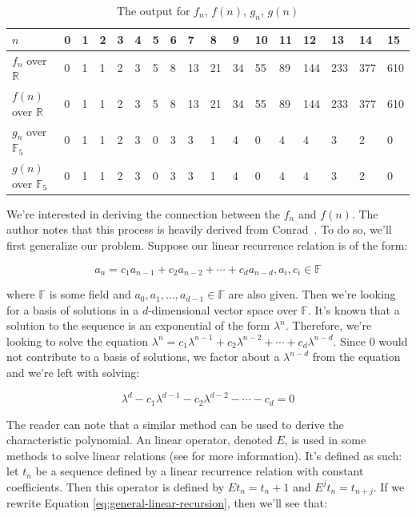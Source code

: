 \documentclass[a4paper]{article}
\theoremstyle{definition}
\begin{document}
\begin{table}[ht]
\centering
\begin{tabular}{lllllllllllllllll}
\toprule
$n$ & 0 & 1 & 2 & 3 & 4 & 5 & 6 & 7 & 8 & 9 & 10 & 11 & 12 & 13 & 14 & 15                             \\
\midrule
$f_n$ over $\mathbb{R}$ & 0 & 1 & 1 & 2 & 3 & 5 & 8 & 13 & 21 & 34 & 55 & 89 & 144 & 233 & 377 & 610  \\
$f(n)$ over $\mathbb{R}$ & 0 & 1 & 1 & 2 & 3 & 5 & 8 & 13 & 21 & 34 & 55 & 89 & 144 & 233 & 377 & 610 \\
$g_n$ over $\mathbb{F}_5$ & 0 & 1 & 1 & 2 & 3 & 0 & 3 & 3 & 1 & 4 & 0 & 4 & 4 & 3 & 2 & 0             \\
$g(n)$ over $\mathbb{F}_5$ & 0 & 1 & 1 & 2 & 3 & 0 & 3 & 3 & 1 & 4 & 0 & 4 & 4 & 3 & 2 & 0            \\
\bottomrule
\end{tabular}
\caption{The output for $f_n$, $f(n)$, $g_n$, $g(n)$}
\label{tab:fib-output}
\end{table}

We're interested in deriving the connection between the $f_n$ and $f(n)$. The author notes that this
process is heavily derived from Conrad~\cite{bib:solve-lin-rec-field}. To do so, we'll first generalize
our problem. Suppose our linear recurrence relation is of the form:

\begin{equation}
a_n=c_1a_{n-1}+c_2a_{n-2}+\cdots+c_{d}a_{n-d}, a_i, c_i \in \mathbb{F}
\label{eq:general-linear-recursion}
\end{equation}

where $\mathbb{F}$ is some field and $a_0, a_1, \ldots, a_{d-1} \in \mathbb{F}$ are also given. Then
we're looking for a basis of solutions in a $d$-dimensional vector space over $\mathbb{F}$. It's known
that a solution to the sequence is an exponential of the form $\lambda^n$\cite{bib:solve-lin-rec-field}.
Therefore, we're looking to solve the equation
$\lambda^n=c_1\lambda^{n-1}+c_2\lambda^{n-2}+\cdots+c_d\lambda^{n-d}$. Since $0$ would not contribute to
a basis of solutions, we factor about a $\lambda^{n-d}$ from the equation and we're left with solving:

\begin{equation}
\lambda^d-c_1\lambda^{d-1}-c_2\lambda^{d-2}-\cdots-c_d=0
\label{eq:char-poly}
\end{equation}

The reader can note that a similar method can be used to derive the characteristic polynomial. An linear
operator, denoted $E$, is used in some methods to solve linear relations (see
\cite{bib:successor-explained} for more information). It's defined as such: let $t_n$ be a sequence
defined by a linear recurrence relation with constant coefficients. Then this operator is defined by
$Et_n=t_n+1$ and $E^{j}t_n=t_{n+j}$\cite{bib:gen_cond_rec}. If we rewrite Equation
\ref{eq:general-linear-recursion}, then we'll see that:
\end{document}
